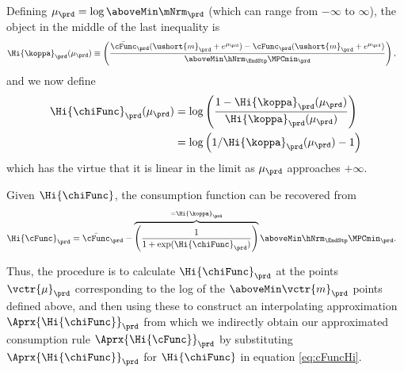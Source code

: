   Defining $\mu_{\prd} =
  \log \aboveMin \mNrm_{\prd}$ (which can range from $-\infty$ to $\infty$), the object in the middle of the last inequality is
  \begin{equation}\begin{gathered}\begin{aligned}
        \Hi{\koppa}_{\prd}(\mu_{\prd})   & \equiv  \left(\frac{\bar{\cFunc}_{\prd}(\ushort{m}_{\prd}+e^{\mu_{\prd}})-\cFunc_{\prd}(\ushort{m}_{\prd}+e^{\mu_{\prd}})}{\aboveMin \hNrm_{\EndStp} \MPCmin_{\prd}}\right), \label{eq:koppa}
      \end{aligned}\end{gathered}\end{equation}
  and we now define
  \begin{equation}\begin{gathered}\begin{aligned}
        \Hi{\chiFunc}_{\prd}(\mu_{\prd})  & = \log \left(\frac{1-\Hi{\koppa}_{\prd}(\mu_{\prd})}{\Hi{\koppa}_{\prd}(\mu_{\prd})}\right)
        \\  & = \log \left(1/\Hi{\koppa}_{\prd}(\mu_{\prd})-1\right) \label{eq:chi}
      \end{aligned}\end{gathered}\end{equation}
  which has the virtue that it is linear in the limit as $\mu_{\prd}$ approaches $+\infty$.

  Given $\Hi{\chiFunc}$, the consumption function can be recovered from
  \begin{equation}\begin{gathered}\begin{aligned}
        \Hi{\cFunc}_{\prd}  & = \bar{\cFunc}_{\prd}-\overbrace{\left(\frac{1}{1+\exp(\Hi{\chiFunc}_{\prd})}\right)}^{=\Hi{\koppa}_{\prd}} \aboveMin \hNrm_{\EndStp} \MPCmin_{\prd}. \label{eq:cFuncHi}
      \end{aligned}\end{gathered}\end{equation}

\mu 
  Thus, the procedure is to calculate $\Hi{\chiFunc}_{\prd}$ at the points
  $\vctr{\mu}_{\prd}$ corresponding to the log of the $\aboveMin
  \vctr{m}_{\prd}$ points defined above, and then using these to construct an
  interpolating approximation $\Aprx{\Hi{\chiFunc}}_{\prd}$ from which we indirectly obtain our
  approximated consumption rule $\Aprx{\Hi{\cFunc}}_{\prd}$ by substituting $\Aprx{\Hi{\chiFunc}}_{\prd}$ for $\Hi{\chiFunc}$ in equation \eqref{eq:cFuncHi}.

